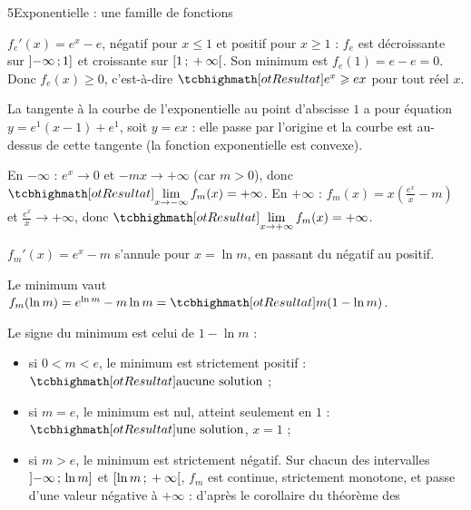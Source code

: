 \begin{corrigeBac}{5}{Exponentielle : une famille de fonctions}
\begin{questions}
  \item $f_e'(x)=e^{x}-e$, négatif pour $x\leq1$ et positif pour $x\geq1$ : $f_e$ est décroissante sur $\mathopen{]}-\infty\,{;}\,1\mathclose{]}$ et croissante
    sur $\mathopen{[}1\,{;}\,+\infty\mathclose{[}$. Son minimum est $f_e(1)=e-e=0$. Donc $f_e(x)\geq0$, c'est-à-dire $\res{e^{x}\geq ex}$ pour tout réel $x$. \pts{1 pt}
  \item La tangente à la courbe de l'exponentielle au point d'abscisse $1$ a pour équation $y=e^{1}(x-1)+e^{1}$, soit $y=ex$ : elle passe
    par l'origine et la courbe est au-dessus de cette tangente (la fonction exponentielle est convexe). 
\end{questions}
\begin{questions}[resume]
  \item En $-\infty$ : $e^{x}\to0$ et $-mx\to+\infty$ (car $m>0$), donc $\res{\lim\limits_{x\to-\infty}f_m(x)=+\infty}$. En $+\infty$ :
    $f_m(x)=x\left(\frac{e^{x}}{x}-m\right)$ et $\frac{e^{x}}{x}\to+\infty$, donc $\res{\lim\limits_{x\to+\infty}f_m(x)=+\infty}$. \pts{1 pt}
  \item $f_m'(x)=e^{x}-m$ s'annule pour $x=\ln m$, en passant du négatif au positif.
\begin{center}
\begin{tableau}
\end{tableau}
\end{center}
    Le minimum vaut $f_m(\ln m)=e^{\ln m}-m\ln m=\res{m(1-\ln m)}$. \pts{1 pt}
  \item Le signe du minimum est celui de $1-\ln m$ :
    \begin{itemize}[leftmargin=1.2em,itemsep=0.3mm,topsep=0.5mm]
      \item si $0<m<e$, le minimum est strictement positif : $\res{\text{aucune solution}}$ ;
      \item si $m=e$, le minimum est nul, atteint seulement en $1$ : $\res{\text{une solution}}$, $x=1$ ;
      \item si $m>e$, le minimum est strictement négatif. Sur chacun des intervalles $\mathopen{]}-\infty\,{;}\,\ln m\mathclose{]}$ et $\mathopen{[}\ln m\,{;}\,+\infty\mathclose{[}$,
        $f_m$ est continue, strictement monotone, et passe d'une valeur négative à $+\infty$ : d'après le corollaire du théorème des

\end{itemize}
\end{questions}
\end{corrigeBac}
